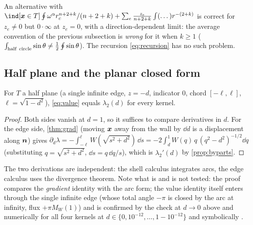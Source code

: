 \begin{remark}
An alternative with $\ind[\xx\in T]\oint\omega^\alpha r_c^{n+2+k}/(n+2+k)+\sum_e\frac{z_e}{n+2+k}\int(\dots)r^{-(2+k)}$
is correct for $z_e\neq0$ but $0\cdot\infty$ at $z_e=0$, with a direction-dependent limit: the average convention
of the previous subsection is \emph{wrong} for it when $k\ge1$ ($\int_{\rm half\ circle}\sin\theta\neq\frac12\oint\sin\theta$).
The recursion \eqref{eq:recursion} has no such problem. 
\end{remark}

\subsection{Half plane and the planar closed form}
\begin{proposition}\label{prop:halfplane}
For $T$ a half plane (a single infinite edge, $z=-d$, indicator $0$, chord $[-\ell,\ell]$, $\ell=\sqrt{1-d^2}$),
\cref{eq:value} equals $\lambda_2(d)$ for every kernel.
\end{proposition}
\begin{proof}
Both sides vanish at $d=1$, so it suffices to compare derivatives in $d$. For the edge side, \cref{thm:grad}
(moving $\bm x$ away from the wall by $\dd d$ is a displacement along $\bm n$) gives
$\partial_d\lambda=-\int_{-\ell}^{\ell}W(\sqrt{s^2+d^2})\,\dd s=-2\int_d^1W(q)\,q\,(q^2-d^2)^{-1/2}\dd q$ (substituting $q=\sqrt{s^2+d^2}$, $\dd s=q\,\dd q/s$),
which is $\lambda_2'(d)$ by \cref{prop:byparts}.
\end{proof}
The two derivations are independent: the shell calculus integrates arcs, the edge calculus uses the divergence theorem. Note what is and is not
tested: the proof compares the \emph{gradient} identity with the arc form; the value identity itself enters through the single infinite edge
(whose total angle $-\pi$ is closed by the arc at infinity, flux $+\pi M_W(1)$) and is confirmed by the check at $d\to0$ above and
numerically for all four kernels at $d\in\{0,10^{-12},\dots,1-10^{-12}\}$ and symbolically .
